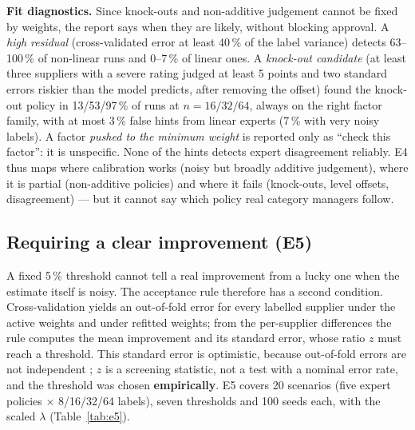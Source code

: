 \documentclass[10pt,twocolumn,a4paper]{article}
\begin{document}
\textbf{Fit diagnostics.} Since knock-outs and non-additive judgement cannot be fixed by
weights, the report says when they are likely, without blocking approval. A \emph{high
residual} (cross-validated error at least 40\,\% of the label variance) detects 63--100\,\%
of non-linear runs and 0--7\,\% of linear ones. A \emph{knock-out candidate} (at least
three suppliers with a severe rating judged at least 5 points and two standard errors
riskier than the model predicts, after removing the offset) found the knock-out policy in
13/53/97\,\% of runs at $n=16/32/64$, always on the right factor family, with at most
3\,\% false hints from linear experts (7\,\% with very noisy labels). A factor \emph{pushed to the minimum weight} is
reported only as ``check this factor'': it is unspecific. None of the hints detects
expert disagreement reliably. E4 thus maps where calibration works (noisy but broadly
additive judgement), where it is partial (non-additive policies) and where it fails
(knock-outs, level offsets, disagreement) --- but it cannot say which policy real category
managers follow.

\subsection{Requiring a clear improvement (E5)}
\label{sec:e5}
A fixed 5\,\% threshold cannot tell a real improvement from a lucky one when the
estimate itself is noisy. The acceptance rule therefore has a second condition.
Cross-validation yields an out-of-fold error for every labelled supplier under the active
weights and under refitted weights; from the per-supplier differences the rule computes the
mean improvement and its standard error, whose ratio $z$ must reach a threshold. This
standard error is optimistic, because out-of-fold errors are not independent
\cite{nadeau2003,bengio2004}; $z$ is a screening statistic, not a test with a nominal
error rate, and the threshold was chosen \textbf{empirically}. E5 covers 20 scenarios
(five expert policies $\times$ 8/16/32/64 labels), seven thresholds and 100 seeds each,
with the scaled $\lambda$ (Table~\ref{tab:e5}).
\end{document}
